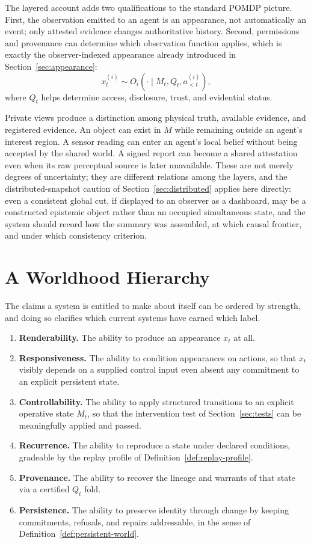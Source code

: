\documentclass[11pt]{article}
\begin{document}
The layered account adds two qualifications to the standard POMDP picture. First, the observation emitted to an agent is an appearance, not automatically an event; only attested evidence changes authoritative history. Second, permissions and provenance can determine which observation function applies, which is exactly the observer-indexed appearance already introduced in Section~\ref{sec:appearance}:
\[
x_t^{(i)} \sim O_i(\cdot \mid M_t, Q_t, a^{(i)}_{<t}),
\]
where $Q_t$ helps determine access, disclosure, trust, and evidential status.

Private views produce a distinction among physical truth, available evidence, and registered evidence. An object can exist in $M$ while remaining outside an agent's interest region. A sensor reading can enter an agent's local belief without being accepted by the shared world. A signed report can become a shared attestation even when its raw perceptual source is later unavailable. These are not merely degrees of uncertainty; they are different relations among the layers, and the distributed-snapshot caution of Section~\ref{sec:distributed} applies here directly: even a consistent global cut, if displayed to an observer as a dashboard, may be a constructed epistemic object rather than an occupied simultaneous state, and the system should record how the summary was assembled, at which causal frontier, and under which consistency criterion.

\section{A Worldhood Hierarchy}
\label{sec:hierarchy}

The claims a system is entitled to make about itself can be ordered by strength, and doing so clarifies which current systems have earned which label.

\begin{enumerate}[label=(\arabic*)]
\item \textbf{Renderability.} The ability to produce an appearance $x_t$ at all.
\item \textbf{Responsiveness.} The ability to condition appearances on actions, so that $x_t$ visibly depends on a supplied control input even absent any commitment to an explicit persistent state.
\item \textbf{Controllability.} The ability to apply structured transitions to an explicit operative state $M_t$, so that the intervention test of Section~\ref{sec:tests} can be meaningfully applied and passed.
\item \textbf{Recurrence.} The ability to reproduce a state under declared conditions, gradeable by the replay profile of Definition~\ref{def:replay-profile}.
\item \textbf{Provenance.} The ability to recover the lineage and warrants of that state via a certified $Q_t$ fold.
\item \textbf{Persistence.} The ability to preserve identity through change by keeping commitments, refusals, and repairs addressable, in the sense of Definition~\ref{def:persistent-world}.
\end{enumerate}
\end{document}

